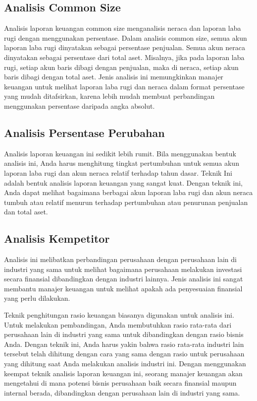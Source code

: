\documentclass[
]{book}
\begin{document}
\hypertarget{analisis-common-size}{%
\subsection{Analisis Common Size}\label{analisis-common-size}}

Analisis laporan keuangan common size menganalisis neraca dan laporan laba rugi dengan menggunakan persentase. Dalam analisis common size, semua akun laporan laba rugi dinyatakan sebagai persentase penjualan. Semua akun neraca dinyatakan sebagai persentase dari total aset. Misalnya, jika pada laporan laba rugi, setiap akun baris dibagi dengan penjualan, maka di neraca, setiap akun baris dibagi dengan total aset. Jenis analisis ini memungkinkan manajer keuangan untuk melihat laporan laba rugi dan neraca dalam format persentase yang mudah ditafsirkan, karena lebih mudah membuat perbandingan menggunakan persentase daripada angka absolut.

\hypertarget{analisis-persentase-perubahan}{%
\subsection{Analisis Persentase Perubahan}\label{analisis-persentase-perubahan}}

Analisis laporan keuangan ini sedikit lebih rumit. Bila menggunakan bentuk analisis ini, Anda harus menghitung tingkat pertumbuhan untuk semua akun laporan laba rugi dan akun neraca relatif terhadap tahun dasar. Teknik Ini adalah bentuk analisis laporan keuangan yang sangat kuat. Dengan teknik ini, Anda dapat melihat bagaimana berbagai akun laporan laba rugi dan akun neraca tumbuh atau relatif menurun terhadap pertumbuhan atau penurunan penjualan dan total aset.

\hypertarget{analisis-kempetitor}{%
\subsection{Analisis Kempetitor}\label{analisis-kempetitor}}

Analisis ini melibatkan perbandingan perusahaan dengan perusahaan lain di industri yang sama untuk melihat bagaimana perusahaan melakukan investasi secara finansial dibandingkan dengan industri lainnya. Jenis analisis ini sangat membantu manajer keuangan untuk melihat apakah ada penyesuaian finansial yang perlu dilakukan.

Teknik penghitungan rasio keuangan biasanya digunakan untuk analisis ini. Untuk melakukan pembandingan, Anda membutuhkan rasio rata-rata dari perusahaan lain di industri yang sama untuk dibandingkan dengan rasio bisnis Anda. Dengan teknik ini, Anda harus yakin bahwa rasio rata-rata industri lain tersebut telah dihitung dengan cara yang sama dengan rasio untuk perusahaan yang dihitung saat Anda melakukan analisis industri ini. Dengan menggunakan keempat teknik analisis laporan keuangan ini, seorang manajer keuangan akan mengetahui di mana potensi bisnis perusahaan baik secara finansial maupun internal berada, dibandingkan dengan perusahaan lain di industri yang sama.
\end{document}
